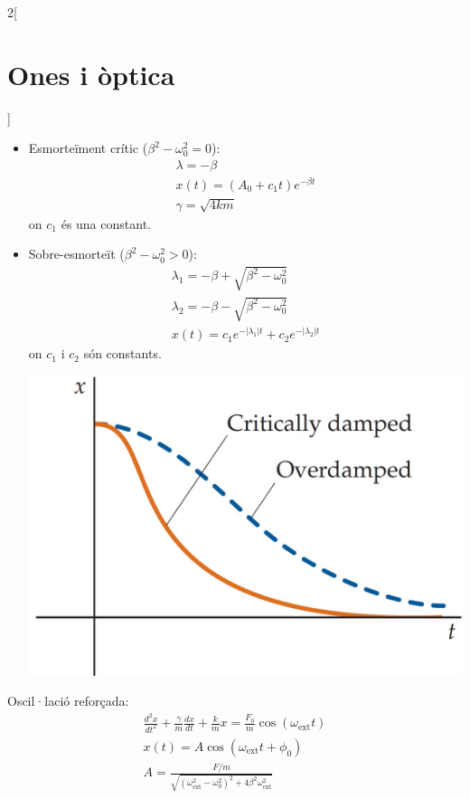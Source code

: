 \documentclass[class=article,10pt,crop=false]{standalone}
\begin{document}
\begin{multicols}{2}[\section{Ones i òptica}]
\begin{itemize}
\begin{minipage}{\linewidth}
    \end{minipage}
    \item Esmorteïment crític ($\beta^2 -\omega_0^2=0$):
    \begin{gather*}
    \lambda=-\beta\\
    x(t)=(A_0+c_1t)e^{-\beta t}\\
    \gamma=\sqrt{4km}
\end{gather*}
{\footnotesize on $c_1$ és una constant.}
    \item Sobre-esmorteït ($\beta^2-\omega_0^2>0$):
    \begin{gather*}
    \lambda_1=-\beta+\sqrt{\beta^2-\omega_0^2}\\
    \lambda_2=-\beta-\sqrt{\beta^2-\omega_0^2}\\
    x(t)=c_1e^{-|\lambda_1|t}+c_2e^{-|\lambda_2|t}
\end{gather*}
{\footnotesize on $c_1$ i $c_2$ són constants.}\newline
    \begin{minipage}{\linewidth}
       \centering
       \includegraphics[width=\linewidth]{Physics/1st/Waves_and_optics/Images/cdamp.jpg}
    \end{minipage}
\end{itemize}
Oscil·lació reforçada:
\begin{gather*}
    \frac{d^2x}{dt^2}+\frac{\gamma}{m}\frac{dx}{dt}+\frac{k}{m}x=\frac{F_0}{m}\cos(\omega_{\text{ext}}t)\\
    x(t)=A\cos(\omega_\text{ext}t+\phi_0)\\
    A=\frac{F/m}{\sqrt{(\omega_{\text{ext}}^2-\omega_0^2)^2+4\beta^2\omega_\text{ext}^2}}\\

\end{gather*}
\end{multicols}
\end{document}
